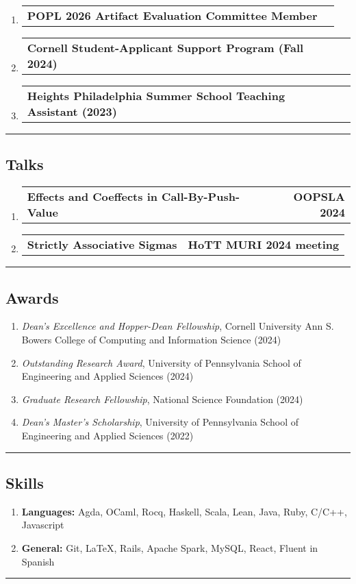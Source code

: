 \documentclass[letterpaper]{article}
\makeatletter
\newcommand{\headerrow}[2]
{\begin{tabular*}{\linewidth}{l@{\extracolsep{\fill}}r}
	#1 &
	#2 \\
\end{tabular*}}
\makeatother
\begin{document}
\begin{enumerate}[label=]
	\parskip=-0.05em
	\item
	\headerrow
        {\textbf{POPL 2026 Artifact Evaluation Committee Member}}
		{}

	\item
	\headerrow
        {\textbf{Cornell Student-Applicant Support Program (Fall 2024)}}
        {}

    \item
		\headerrow
            {\textbf{Heights Philadelphia Summer School Teaching Assistant (2023)}}
            {}
\end{enumerate}

\hrule
\subsection*{Talks}

\begin{enumerate}[label=]
	\parskip=-0.05em
	\item
	\headerrow
        {\textbf{Effects and Coeffects in Call-By-Push-Value}}
		{\textbf{OOPSLA 2024}}

	\item
	\headerrow
        {\textbf{Strictly Associative Sigmas}}
		{\textbf{HoTT MURI 2024 meeting}}
\end{enumerate}

\hrule

\subsection*{Awards}
\begin{enumerate}[label=]
	\parskip=-0.25em
    \item \emph{Dean's Excellence and Hopper-Dean Fellowship}, Cornell University Ann S. Bowers College of Computing and Information Science (2024)
    \item \emph{Outstanding Research Award}, University of Pennsylvania School of Engineering and Applied Sciences (2024)
    \item \emph{Graduate Research Fellowship}, National Science Foundation (2024)
    \item \emph{Dean's Master's Scholarship}, University of Pennsylvania School of Engineering and Applied Sciences (2022)
\end{enumerate}
\hrule

\subsection*{Skills}
\begin{enumerate}[label=]
	\parskip=-0.25em

	\item
       \textbf{Languages: } Agda, OCaml, Rocq, Haskell, Scala, Lean, Java, Ruby, C/C++, Javascript

	\item
	\textbf{General: }
        Git,
        \LaTeX,
        Rails,
        Apache Spark,
        MySQL,
        React,
        Fluent in Spanish

\end{enumerate}
\hrule
\end{document}

